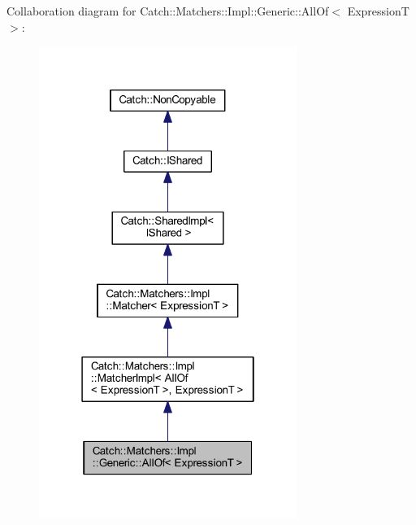 Collaboration diagram for Catch\+:\+:Matchers\+:\+:Impl\+:\+:Generic\+:\+:All\+Of$<$ ExpressionT $>$\+:\nopagebreak
\begin{figure}[H]
\begin{center}
\leavevmode
\includegraphics[width=238pt]{class_catch_1_1_matchers_1_1_impl_1_1_generic_1_1_all_of__coll__graph}
\end{center}
\end{figure}
